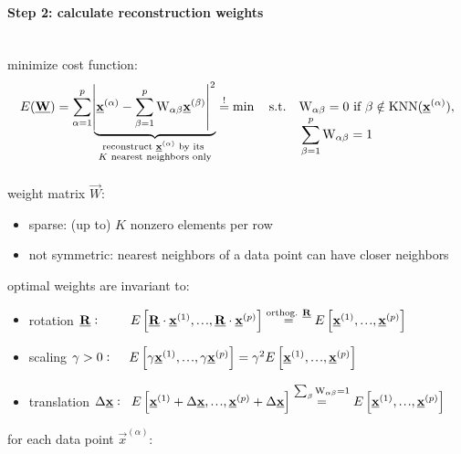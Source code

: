 \paragraph{Step 2: calculate reconstruction weights}\mbox{}\\
\small
minimize cost function:
\vspace{-0.2cm}
\begin{align*}
E(\underline{\mathbf{W}}) = \sum_{\alpha=1}^{p} \underbrace{\abs{\underline{\mathbf{x}}^{(\alpha)} - \sum_{\beta=1}^{p} \mathrm{W}_{\alpha \beta} \underline{\mathbf{x}}^{(\beta)}}^2}_{\substack{\text{reconstruct } \underline{\mathbf{x}}^{(\alpha)} \text{ by its } \\ K \text{ nearest neighbors only}}} \stackrel{\mathrm{!}}{=} \min \quad \text{s.t.} \quad &\mathrm{W}_{\alpha \beta} = 0 \text{ if } \beta \notin \operatorname{KNN}(\underline{\mathbf{x}}^{(\alpha)}), \\[-40pt]
&\sum_{\beta=1}^{p} \mathrm{W}_{\alpha \beta} = 1
\end{align*}\\
\vspace{0.2cm}
weight matrix $\vec{W}$: 
\begin{itemize}
	\item sparse: (up to) $K$ nonzero elements per row
	\item not symmetric: nearest neighbors of a data point can have closer neighbors
\end{itemize}
optimal weights are invariant to:
\begin{itemize}
	\item rotation $\vec{R}: \hspace{0.8cm} E\left[ \vec{R}\cdot\vec{x}^{(1)}, \mydots, \vec{R}\cdot\vec{x}^{(p)} \right] \stackrel{\text{orthog. } \vec{R}}{=} E\left[ \vec{x}^{(1)}, \mydots, \vec{x}^{(p)} \right] $ 
	\item scaling $\gamma > 0: \hspace{4.3mm} E\left[ \gamma\vec{x}^{(1)}, \mydots, \gamma\vec{x}^{(p)} \right] = \gamma^2 E\left[ \vec{x}^{(1)}, \mydots, \vec{x}^{(p)} \right]$
	\item translation $\Delta \vec{x}: \hspace{2mm} E\left[ \vec{x}^{(1)}+\Delta \vec{x}, \mydots, \vec{x}^{(p)}+\Delta \vec{x} \right] \stackrel{\sum_{\beta} \mathrm{W}_{\alpha \beta} = 1}{=} E\left[ \vec{x}^{(1)}, \mydots, \vec{x}^{(p)} \right]$
\end{itemize}
for each data point $\vec{x}^{(\alpha)}:$
